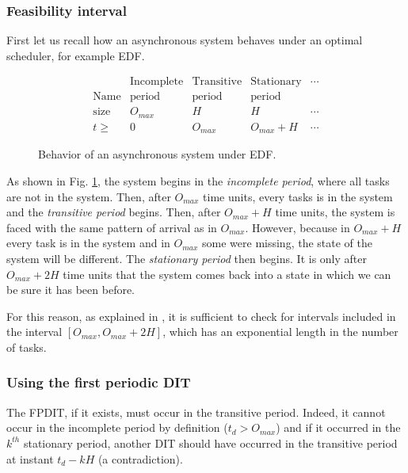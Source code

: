 \documentclass[conference]{IEEEtran}
\begin{document}
		\subsubsection{Feasibility interval}
			First let us recall how an asynchronous system behaves under an optimal
			scheduler, for example EDF.

			\begin{figure}[h]
				\[
					\begin{array}{r||c|c|c|l}
									& \text{Incomplete} & \text{Transitive} & \text{Stationary} & \cdots \\
						\text{Name} & \text{period} 	& \text{period} 	& \text{period}  	& \\ \hline
						\text{size} & O_{max} 			& H 				& H 				& \cdots \\ \hline
						t \geqslant & 0 				& O_{max} 			& O_{max} + H 		& \cdots
					\end{array}
				\]
				\begin{center}
				\caption{Behavior of an asynchronous system under EDF.}
				\label{fig:asyncBehavior}
				\end{center}
			\end{figure}

As shown in Fig. \ref{fig:asyncBehavior}, the system begins in the \emph{incomplete period}, where all tasks are not in the system. Then, after $O_{max}$ time units, every tasks is in the system and the \emph{transitive period} begins. Then, after $O_{max} + H$ time units, the system is faced with the same pattern of arrival as in $O_{max}$. However, because in $O_{max} + H$ every task is in the system and in $O_{max}$ some were missing, the state of the system will be different. The \emph{stationary period} then begins. It is only after $O_{max} + 2H$ time units that the system comes back into a state in which we can be sure it has been before.

For this reason, as explained in \cite{leung1982complexity}, it is sufficient to check for intervals included in the interval $[O_{max}, O_{max} + 2H]$, which has an exponential length in the number of tasks.

\subsubsection{Using the first periodic DIT}

The FPDIT, if it exists, must occur in the transitive period. Indeed, it cannot occur in the incomplete period by definition ($t_d > O_{max}$) and if it occurred in the $k^{th}$ stationary period, another DIT should have occurred in the transitive period at instant $t_d - k H$ (a contradiction).
\end{document}
